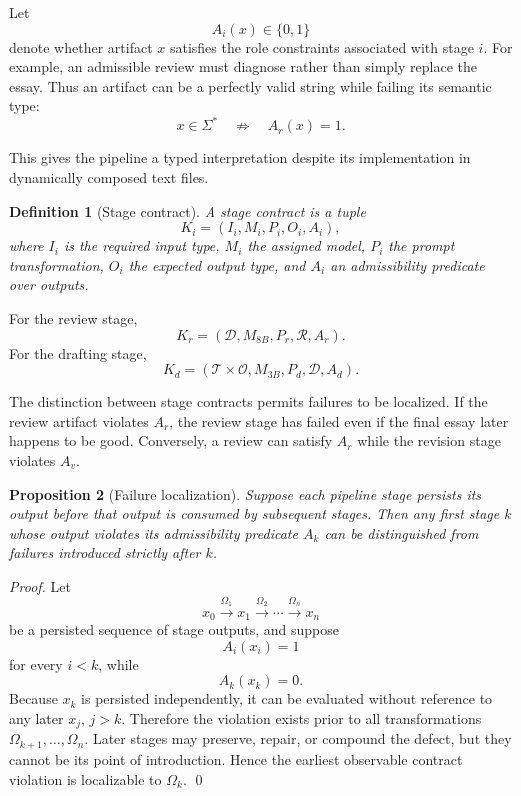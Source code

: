 \documentclass[11pt]{article}
\newtheorem{definition}{Definition}[section]
\newtheorem{proposition}[definition]{Proposition}
\begin{document}
Let
\[
    A_i(x)\in\{0,1\}
\]
denote whether artifact \(x\) satisfies the role constraints associated with stage \(i\). For example, an admissible review must diagnose rather than simply replace the essay. Thus an artifact can be a perfectly valid string while failing its semantic type:
\[
    x\in\Sigma^\ast
    \quad\not\Rightarrow\quad
    A_r(x)=1.
\]

This gives the pipeline a typed interpretation despite its implementation in dynamically composed text files.

\begin{definition}[Stage contract]
A stage contract is a tuple
\[
    K_i=(I_i,M_i,P_i,O_i,A_i),
\]
where \(I_i\) is the required input type, \(M_i\) the assigned model, \(P_i\) the prompt transformation, \(O_i\) the expected output type, and \(A_i\) an admissibility predicate over outputs.
\end{definition}

For the review stage,
\[
    K_r
    =
    (\mathcal{D},
    M_{8B},
    P_r,
    \mathcal{R},
    A_r).
\]
For the drafting stage,
\[
    K_d
    =
    (\mathcal{T}\times\mathcal{O},
    M_{3B},
    P_d,
    \mathcal{D},
    A_d).
\]

The distinction between stage contracts permits failures to be localized. If the review artifact violates \(A_r\), the review stage has failed even if the final essay later happens to be good. Conversely, a review can satisfy \(A_r\) while the revision stage violates \(A_v\).

\begin{proposition}[Failure localization]
Suppose each pipeline stage persists its output before that output is consumed by subsequent stages. Then any first stage \(k\) whose output violates its admissibility predicate \(A_k\) can be distinguished from failures introduced strictly after \(k\).
\end{proposition}

\begin{proof}
Let
\[
    x_0\xrightarrow{\Omega_1}x_1
    \xrightarrow{\Omega_2}\cdots
    \xrightarrow{\Omega_n}x_n
\]
be a persisted sequence of stage outputs, and suppose
\[
    A_i(x_i)=1
\]
for every \(i<k\), while
\[
    A_k(x_k)=0.
\]
Because \(x_k\) is persisted independently, it can be evaluated without reference to any later \(x_j\), \(j>k\). Therefore the violation exists prior to all transformations \(\Omega_{k+1},\ldots,\Omega_n\). Later stages may preserve, repair, or compound the defect, but they cannot be its point of introduction. Hence the earliest observable contract violation is localizable to \(\Omega_k\). \qed
\end{proof}
\end{document}
